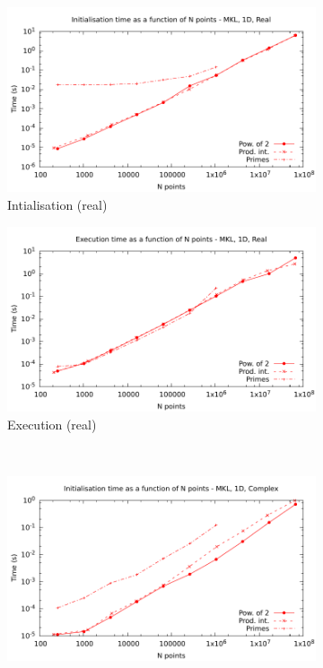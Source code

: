 \documentclass[12pt, a4paper]{article}
\begin{document}
\begin{figure}[htb]
\captionsetup{width=0.8\linewidth}
\centering
\begin{subfigure}{.5\textwidth}
\centering
\includegraphics[width=.9\linewidth]{graphs/1d-mkl-init-r.pdf}
\caption{Intialisation (real)}
\label{1DMKLRI}
\end{subfigure}%
\begin{subfigure}{.5\textwidth}
\centering
\includegraphics[width=.9\linewidth]{graphs/1d-mkl-exec-r.pdf}
\caption{Execution (real)}
\label{1DMKLR}
\end{subfigure}\\
\begin{subfigure}{.5\textwidth}
\centering
\includegraphics[width=.9\linewidth]{graphs/1d-mkl-init-c.pdf}

\end{subfigure}
\end{figure}
\end{document}
